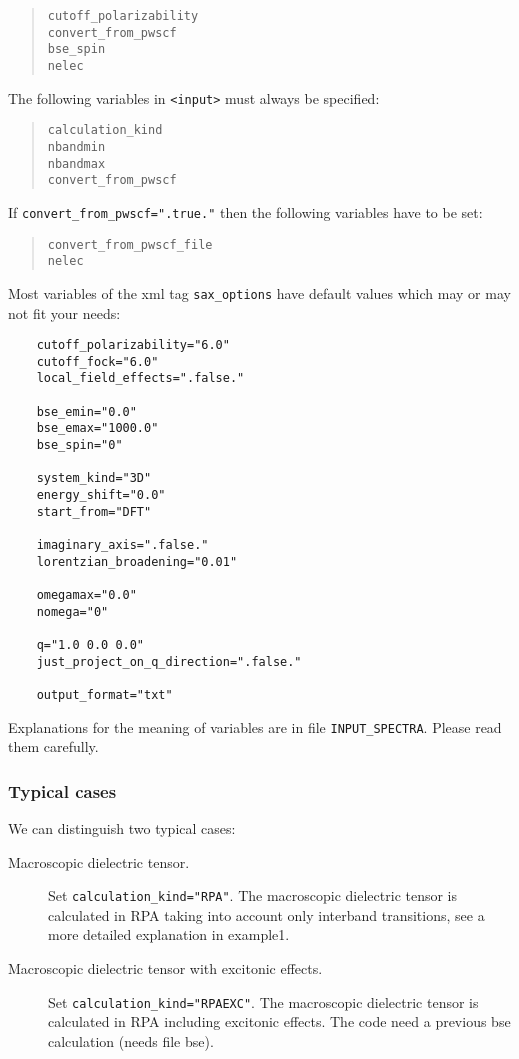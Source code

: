 \documentclass[11pt]{article}
\begin{document}
\begin{quote}
  \texttt{cutoff\_polarizability}\\ 
  \texttt{convert\_from\_pwscf}\\
  \texttt{bse\_spin}\\ 
  \texttt{nelec} 
\end{quote}

The following variables in \texttt{<input>} must always be
specified:
\begin{quote}
  \texttt{calculation\_kind}\\
  \texttt{nbandmin}\\
  \texttt{nbandmax}\\
  \texttt{convert\_from\_pwscf}\\
\end{quote}
If \texttt{convert\_from\_pwscf=".true."} then the following variables have to be set:
\begin{quote}
  \texttt{convert\_from\_pwscf\_file}\\
  \texttt{nelec}\\
\end{quote}

Most variables of the xml tag \texttt{sax\_options} have default values which may or may not fit your needs:
\begin{verbatim}
    cutoff_polarizability="6.0"
    cutoff_fock="6.0"
    local_field_effects=".false."

    bse_emin="0.0"
    bse_emax="1000.0"
    bse_spin="0"

    system_kind="3D"
    energy_shift="0.0"
    start_from="DFT"

    imaginary_axis=".false."
    lorentzian_broadening="0.01"

    omegamax="0.0"
    nomega="0"

    q="1.0 0.0 0.0"
    just_project_on_q_direction=".false."

    output_format="txt"
\end{verbatim}

Explanations for the meaning of variables are in file \texttt{INPUT\_SPECTRA}. Please read them carefully.

\subsubsection{Typical cases}
We can distinguish two typical cases:

\begin{description}

  \item [Macroscopic dielectric tensor.]
    Set \texttt{calculation\_kind="RPA"}. The macroscopic dielectric tensor is calculated in RPA taking into account only interband transitions, see a more detailed explanation in example1.

  \item [Macroscopic dielectric tensor with excitonic effects.]
    Set \texttt{calculation\_kind="RPAEXC"}. The macroscopic dielectric tensor is calculated in RPA including excitonic effects. The code need a previous bse calculation (needs file bse).
\end{description}
\end{document}

